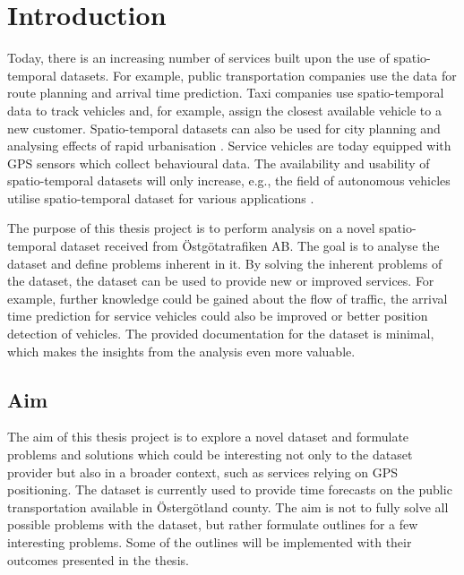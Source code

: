 \chapter{Introduction}
\label{cha:introduction}

Today, there is an increasing number of services built upon the use of spatio-temporal datasets.
For example, public transportation companies use the data for route planning and arrival time prediction.
Taxi companies use spatio-temporal data to track vehicles and, for example, assign the closest available vehicle to a new customer.
Spatio-temporal datasets can also be used for city planning and analysing effects of rapid urbanisation \cite{Deng2009, Liu2005}.
Service vehicles are today equipped with GPS sensors which collect behavioural data.
The availability and usability of spatio-temporal datasets will only increase, e.g., the field of autonomous vehicles utilise spatio-temporal dataset for various applications \cite{Dickmanns1990, Peng2018}.

The purpose of this thesis project is to perform analysis on a novel spatio-temporal dataset received from Östgötatrafiken AB.
The goal is to analyse the dataset and define problems inherent in it.
By solving the inherent problems of the dataset, the dataset can be used to provide new or improved services.
For example, further knowledge could be gained about the flow of traffic, the arrival time prediction for service vehicles could also be improved or better position detection of vehicles.
The provided documentation for the dataset is minimal, which makes the insights from the analysis even more valuable.

\section{Aim}
\label{sec:aim}
The aim of this thesis project is to explore a novel dataset and formulate problems and solutions which could be interesting not only to the dataset provider but also in a broader context, such as services relying on GPS positioning.
The dataset is currently used to provide time forecasts on the public transportation available in Östergötland county.
The aim is not to fully solve all possible problems with the dataset, but rather formulate outlines for a few interesting problems.
Some of the outlines will be implemented with their outcomes presented in the thesis.


